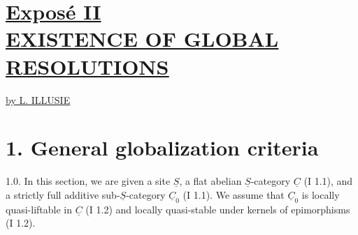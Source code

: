 %
\section*{\underline{Exposé II}\\[3pt] \underline{\underline{EXISTENCE OF GLOBAL RESOLUTIONS}}}
\begin{center}
\underline{by L. ILLUSIE}
\end{center}

\section*{1. General globalization criteria}

1.0. In this section, we are given a site $\underline{S}$, a flat abelian $\underline{S}$-category $\underline{C}$ (I 1.1), and a strictly full additive sub-$\underline{S}$-category $\underline{C}_0$ (I 1.1). We assume that $\underline{C}_0$ is locally quasi-liftable in $\underline{C}$ (I 1.2) and locally quasi-stable under kernels of epimorphisms (I 1.2).

